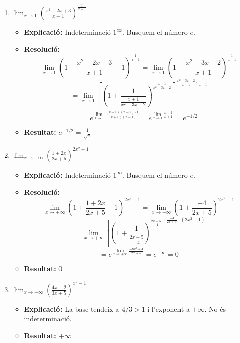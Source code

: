 \documentclass[12pt,a4paper]{article}
\begin{document}
\begin{enumerate}[label=\textbf{7.\arabic*.}]
    \item $\lim_{x \to 1} \left( \frac{x^2-2x+3}{x+1} \right)^{\frac{1}{x-1}}$
        \begin{itemize}
            \item \textbf{Explicació:} Indeterminació $1^\infty$. Busquem el número $e$.
            \item \textbf{Resolució:}
            $$ \lim_{x \to 1} \left( 1 + \frac{x^2-2x+3}{x+1} - 1 \right)^{\frac{1}{x-1}} = \lim_{x \to 1} \left( 1 + \frac{x^2-3x+2}{x+1} \right)^{\frac{1}{x-1}} $$
            $$ = \lim_{x \to 1} \left[ \left( 1 + \frac{1}{\frac{x+1}{x^2-3x+2}} \right)^{\frac{x+1}{x^2-3x+2}} \right]^{\frac{x^2-3x+2}{x+1} \cdot \frac{1}{x-1}} $$
            $$ = e^{\lim_{x \to 1} \frac{(x-1)(x-2) \cdot 1}{(x+1)(x-1)}} = e^{\lim_{x \to 1} \frac{x-2}{x+1}} = e^{-1/2} $$
            \item \textbf{Resultat:} $e^{-1/2} = \frac{1}{\sqrt{e}}$
        \end{itemize}

    \item $\lim_{x \to +\infty} \left( \frac{1+2x}{2x+5} \right)^{2x^2-1}$
        \begin{itemize}
            \item \textbf{Explicació:} Indeterminació $1^\infty$. Busquem el número $e$.
            \item \textbf{Resolució:}
            $$ \lim_{x \to +\infty} \left( 1 + \frac{1+2x}{2x+5} - 1 \right)^{2x^2-1} = \lim_{x \to +\infty} \left( 1 + \frac{-4}{2x+5} \right)^{2x^2-1} $$
            $$ = \lim_{x \to +\infty} \left[ \left( 1 + \frac{1}{\frac{2x+5}{-4}} \right)^{\frac{2x+5}{-4}} \right]^{\frac{-4}{2x+5} \cdot (2x^2-1)} $$
            $$ = e^{\lim_{x \to +\infty} \frac{-8x^2+4}{2x+5}} = e^{-\infty} = 0 $$
            \item \textbf{Resultat:} $0$
        \end{itemize}

    \item $\lim_{x \to -\infty} \left( \frac{4x-2}{3x+5} \right)^{x^2-1}$
        \begin{itemize}
            \item \textbf{Explicació:} La base tendeix a $4/3 > 1$ i l'exponent a $+\infty$. No és indeterminació.
            \item \textbf{Resultat:} $+\infty$
        \end{itemize}


\end{enumerate}
\end{document}
